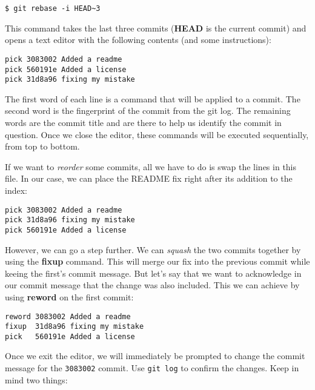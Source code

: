 \begin{lstlisting}[style=bashstyle]
$ git rebase -i HEAD~3
\end{lstlisting}

This command takes the last three commits (\textbf{HEAD} is the current commit)
and opens a text editor with the following contents (and some instructions):

\begin{lstlisting}
pick 3083002 Added a readme
pick 560191e Added a license
pick 31d8a96 fixing my mistake
\end{lstlisting}

The first word of each line is a command that will be applied to a commit.
The second word is the fingerprint of the commit from the git log. The remaining
words are the commit title and are there to help us identify the commit in
question. Once we close the editor, these commands will be executed
sequentially, from top to bottom.

If we want to \textit{reorder} some commits, all we have to do is swap the lines
in this file. In our case, we can place the README fix right after its addition
to the index:

\begin{lstlisting}
pick 3083002 Added a readme
pick 31d8a96 fixing my mistake
pick 560191e Added a license
\end{lstlisting}

However, we can go a step further. We can \textit{squash} the two commits
together by using the \textbf{fixup} command. This will merge our fix into the
previous commit while keeing the first's commit message. But let's say that we
want to acknowledge in our commit message that the change was also included.
This we can achieve by using \textbf{reword} on the first commit:

\begin{lstlisting}
reword 3083002 Added a readme
fixup  31d8a96 fixing my mistake
pick   560191e Added a license
\end{lstlisting}

Once we exit the editor, we will immediately be prompted to change the commit
message for the \texttt{3083002} commit. Use \texttt{git log} to confirm the
changes. Keep in mind two things:

